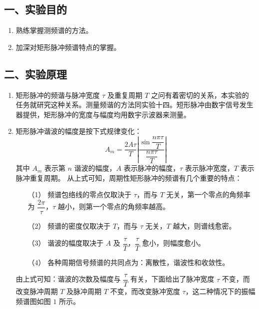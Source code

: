 \documentclass[dvipsnames, svgnames,a4paper,11pt]{article}
\begin{document}
\subsection*{一、实验目的}
\begin{enumerate}
	\item 熟练掌握测频谱的方法。
	\item 加深对矩形脉冲频谱特点的掌握。
\end{enumerate}

\begin{figure}[htbp]
	\centering

	\caption{}
\end{figure}

\subsection*{二、实验原理}
\begin{enumerate}
  \item 矩形脉冲的频谐与脉冲宽度 $\tau$ 及重复周期 $T$ 之问有着密切的关系，本实验的任务就研究这种关系。测量频谐的方法同实验十四。短形脉冲由数宇信号发生器提供，矩形脉冲的宽度与幅度均用数宇示波器来测量。
  \item 矩形脉冲谐波的幅度是按下式规律变化：
        \begin{equation*}
          A_m = \dfrac{2A\tau}{T}\left |\dfrac{\sin \dfrac{n\pi\tau}{T}}{\dfrac{n\pi\tau}{T}} \right |
        \end{equation*}
        其中 $A_m$ 表示第 $n$ 谐波的幅度，$A$ 表示脉冲的幅度，$\tau$ 表示脉冲宽度，$T$ 表示脉冲重复周期。
        从上式可知，周期性矩形脉冲的频谱有几个重要的特点：
        \begin{enumerate}
          \item[（1）] 频谱包络线的零点仅取決于 $\tau$，而与 $T$ 无关，第一个零点的角频率为 $\dfrac{2\pi}{\tau}$，$\tau$ 越小，则第一个零点的角频率越高。
          \item[（2）] 频谱的密度仅取决于 $T$，而与 $\tau$ 无关，$T$ 越大，则谱线愈密。
          \item[（3）] 谐波的幅度取决于 $A$ 及 $\dfrac{\tau}{T}$，$\dfrac{\tau}{T}$ 愈小，则幅度愈小。
          \item[（4）] 各种周期信号频谱的共同点为：离散性，谐波性和收敛性。
        \end{enumerate}
        由上式可知：谐波的次数及幅度与 $\dfrac{\tau}{T}$ 有关，下面给出了脉冲宽度 $\tau$ 不变，而改变脉冲周期 $T$ 及脉冲周期 $T$ 不变，而改变脉冲宽度 $\tau$，这二种情况下的振幅频谱图如图 $1$ 所示。
\end{enumerate}
\end{document}
